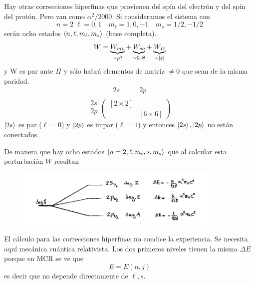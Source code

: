 \documentclass[10pt,oneside]{CBFT_book}
\begin{document}
Hay otras correcciones hiperfinas que provienen del spín del electrón y del spín del protón. Pero van como 
$\alpha^2/2000$.
Si consideramos el sistema con 
\[
	n=2 \; \ell=0,1 \quad m_\ell = 1,0,-1 \quad m_s=1/2,-1/2
\]
serán ocho estados $\Braket{n,\ell,m_\ell,m_s}$ (base completa).
\[
	W = \underbrace{W_{mv}}_{\sim p^4} + \underbrace{W_{so}}_{\sim \vb{L}\cdot\vb{S}} + 
	\underbrace{W_D}_{\sim |\vb{r}|}
\]
y W es par ante $\Pi$ y sólo habrá elementos de matriz $\neq 0$ que sean de la misma paridad.
\[
	\begin{matrix}
	2s & \qquad 2p \\	 
	\end{matrix}
\]
\[
\begin{matrix}
 2s\\
 2p\\
\end{matrix}
	\begin{pmatrix}
	[2\times 2] & \\
	& [ 6\times 6 ] 
	\end{pmatrix}
\]
$\Ket{2s}$ es par ($\ell=0$) y $\Ket{2p}$ es impar ($\ell=1$) y entonces $\Ket{2s}, \Ket{2p}$
no están conectados.

De manera que hay ocho estados $\Ket{n=2,\ell,m_\ell,s,m_s}$ que al calcular esta perturbación $W$
resultan 
\begin{figure}[htb]
	\begin{center}
	\includegraphics[width=0.9\textwidth]{images/teo2_21.pdf}
	\end{center}
	\caption{}
\end{figure} 

El cálculo para las correcciones hiperfinas no condice la experiencia. Se necesita aquí mecánica cuántica 
relativista. Los dos primeros niveles tienen la misma $\Delta E$ porque en MCR se ve que 
\[
	E = E(n,j) 
\]
es decir que no depende directamente de $\ell,s$.
\end{document}
